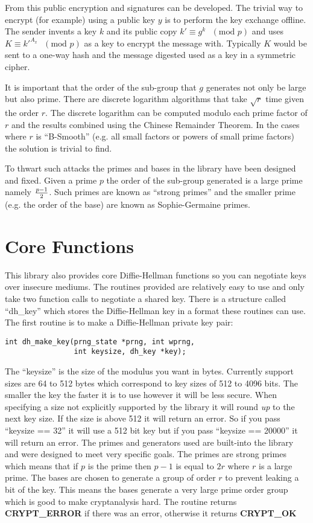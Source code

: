 \documentclass{book}
\begin{document}
From this public encryption and signatures can be developed.  The trivial way to encrypt (for example) using a public key 
$y$ is to perform the key exchange offline.  The sender invents a key $k$ and its public copy 
$k' \equiv g^k\mbox{ }(\mbox{mod }p)$ and uses $K \equiv k'^{A_x}\mbox{ }(\mbox{mod }p)$ as a key to encrypt
the message with.  Typically $K$ would be sent to a one-way hash and the message digested used as a key in a 
symmetric cipher.

It is important that the order of the sub-group that $g$ generates not only be large but also prime.  There are
discrete logarithm algorithms that take $\sqrt r$ time given the order $r$.  The discrete logarithm can be computed
modulo each prime factor of $r$ and the results combined using the Chinese Remainder Theorem.  In the cases where 
$r$ is ``B-Smooth'' (e.g. all small factors or powers of small prime factors) the solution is trivial to find.

To thwart such attacks the primes and bases in the library have been designed and fixed.  Given a prime $p$ the order of
 the sub-group generated is a large prime namely ${p - 1} \over 2$.  Such primes are known as ``strong primes'' and the 
smaller prime (e.g. the order of the base) are known as Sophie-Germaine primes.

\section{Core Functions}

This library also provides core Diffie-Hellman functions so you can negotiate keys over insecure mediums.  The routines 
provided are relatively easy to use and only take two function calls to negotiate a shared key.  There is a structure
called ``dh\_key'' which stores the Diffie-Hellman key in a format these routines can use.  The first routine is to
make a Diffie-Hellman private key pair:
\begin{verbatim}
int dh_make_key(prng_state *prng, int wprng, 
                int keysize, dh_key *key);
\end{verbatim}
The ``keysize'' is the size of the modulus you want in bytes.  Currently support sizes are 64 to 512 bytes which correspond 
to key sizes of 512 to 4096 bits. The smaller the key the faster it is to use however it will be less secure.  When 
specifying a size not explicitly supported by the library it will round {\em up} to the next key size.  If the size is 
above 512 it will return an error.  So if you pass ``keysize == 32'' it will use a 512 bit key but if you pass 
``keysize == 20000'' it will return an error.  The primes and generators used are built-into the library and were designed 
to meet very specific goals.  The primes are strong primes which means that if $p$ is the prime then
$p-1$ is equal to $2r$ where $r$ is a large prime.  The bases are chosen to generate a group of order $r$ to prevent
leaking a bit of the key.  This means the bases generate a very large prime order group which is good to make cryptanalysis
hard. The routine returns {\bf CRYPT\_ERROR} if there was an error, otherwise it returns {\bf CRYPT\_OK}
\end{document}
